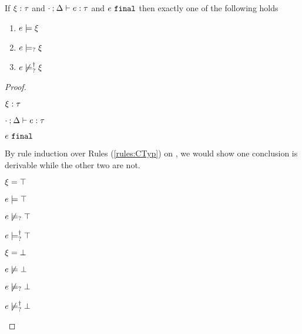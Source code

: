 \begin{theorem}
  \label{thrm:exclusive-constraint-satisfaction}
  If $\xi : \tau$ and $\cdot \mathbin{;} \Delta \vdash e : \tau$ and $e ~\mathtt{final}$ then exactly one of the following holds
  \begin{enumerate}
    \item $e \models \xi$
    \item $e \models_{?} \xi$
    \item $e \not\models_{?}^{\dag} \xi$
  \end{enumerate}
\end{theorem}
\begin{proof}
\begin{pfsteps*}
\item $\xi : \tau$  
\item $\cdot \mathbin{;} \Delta \vdash e : \tau$  
\item $e ~\mathtt{final}$  
\end{pfsteps*}
By rule induction over Rules (\ref{rules:CTyp}) on , we would show one conclusion is derivable while the other two are not.
\begin{byCases}

\item[\text{(\ref{rule:CTTruth})}]
    \begin{pfsteps*}
    \item $\xi=\top$ 
    \item $e \models \top$  
    \item $e \not\models_{?} \top$ 
    \item $e \models_{?}^{\dag} \top$ 
    \end{pfsteps*}
    
\item[\text{(\ref{rule:CTFalsity})}]
    \begin{pfsteps*}
    \item $\xi=\bot$ 
    \item $e \not\models \bot$  
    \item $e \not\models_{?} \bot$  
    \item $e \not\models_{?}^{\dag} \bot$ 
    \end{pfsteps*}
    

\end{byCases}
\end{proof}
